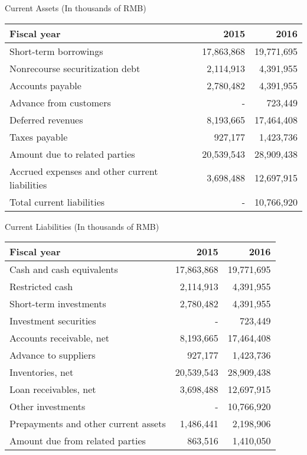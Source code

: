 \begin{center}
	
Current Assets (In thousands of RMB\textyen)

	\begin{tabular}{lrr}
		\toprule
		Fiscal year&2015&2016\\
		\midrule
		Short-term borrowings&17,863,868&19,771,695\\
		Nonrecourse securitization debt&2,114,913&4,391,955\\
		Accounts payable&2,780,482&4,391,955\\
		Advance from customers&-&723,449\\
		Deferred revenues&8,193,665&17,464,408\\
		Taxes payable&927,177&1,423,736\\
		Amount due to related parties&20,539,543&28,909,438\\
		Accrued expenses and other current liabilities&3,698,488&12,697,915\\
		Total current liabilities&-&10,766,920\\
		\bottomrule
	\end{tabular}
\end{center}

\begin{center}
	
Current Liabilities (In thousands of RMB\textyen)

\begin{tabular}{lrr}
	\toprule
	Fiscal year&2015&2016\\
	\midrule
	Cash and cash equivalents&17,863,868&19,771,695\\
	Restricted cash&2,114,913&4,391,955\\
	Short-term investments&2,780,482&4,391,955\\
	Investment securities&-&723,449\\
	Accounts receivable, net&8,193,665&17,464,408\\
	Advance to suppliers&927,177&1,423,736\\
	Inventories, net&20,539,543&28,909,438\\
	Loan receivables, net&3,698,488&12,697,915\\
	Other investments&-&10,766,920\\
	Prepayments and other current assets&1,486,441&2,198,906\\
	Amount due from related parties&863,516&1,410,050\\
	\bottomrule
\end{tabular}
\end{center}

